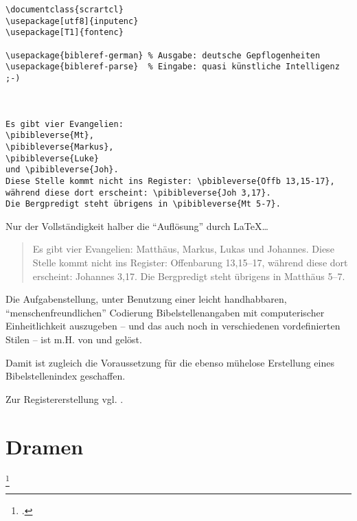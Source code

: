 \begin{lstlisting}
\documentclass{scrartcl} 
\usepackage[utf8]{inputenc}
\usepackage[T1]{fontenc}

\usepackage{bibleref-german} % Ausgabe: deutsche Gepflogenheiten
\usepackage{bibleref-parse}  % Eingabe: quasi künstliche Intelligenz ;-)



Es gibt vier Evangelien: 
\pibibleverse{Mt}, 
\pibibleverse{Markus}, 
\pibibleverse{Luke} 
und \pibibleverse{Joh}. 
Diese Stelle kommt nicht ins Register: \pbibleverse{Offb 13,15-17}, 
während diese dort erscheint: \pibibleverse{Joh 3,17}. 
Die Bergpredigt steht übrigens in \pibibleverse{Mt 5-7}.

\end{lstlisting}


Nur der Vollständigkeit halber die \enquote{Auflösung} durch \LaTeX\ldots

\begin{quotation}
    Es gibt vier Evangelien: Matthäus, Markus, Lukas und Johannes. Diese Stelle kommt
    nicht ins Register: Offenbarung 13,15–17, während diese dort erscheint: Johannes 3,17.
    Die Bergpredigt steht übrigens in Matthäus 5–7.
\end{quotation}

Die Aufgabenstellung, unter Benutzung einer leicht handhabbaren, \enquote{menschenfreundlichen} Codierung
Bibelstellenangaben mit computerischer Einheitlichkeit auszugeben -- und das auch noch in verschiedenen
vordefinierten Stilen -- ist m.H. von  und  gelöst.

Damit ist zugleich die Voraussetzung für die ebenso mühelose Erstellung eines Bibelstellenindex geschaffen.

Zur Registererstellung vgl. .




	

\section{Dramen}

\footcite[xxx]{lesetypographie}




